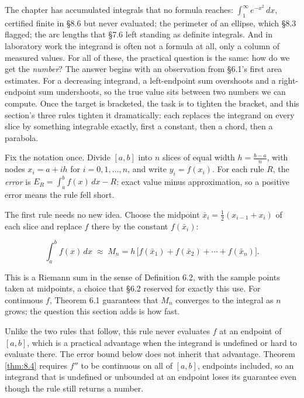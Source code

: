 \documentclass[a4paper,12pt,oneside]{memoir}
\begin{document}
The chapter has accumulated integrals that no formula reaches: \(\int_{1}^{\infty} e^{-x^{2}}\,dx\), certified finite in §8.6 but never evaluated; the perimeter of an ellipse, which §8.3 flagged; the arc lengths that §7.6 left standing as definite integrals. And in laboratory work the integrand is often not a formula at all, only a column of measured values. For all of these, the practical question is the same: how do we get the \emph{number}? The answer begins with an observation from §6.1’s first area estimates. For a decreasing integrand, a left-endpoint sum overshoots and a right-endpoint sum undershoots, so the true value sits between two numbers we can compute. Once the target is bracketed, the task is to tighten the bracket, and this section’s three rules tighten it dramatically: each replaces the integrand on every slice by something integrable exactly, first a constant, then a chord, then a parabola.

Fix the notation once. Divide \([a, b]\) into \(n\) slices of equal width \(h = \tfrac{b - a}{n}\), with nodes \(x_{i} = a + ih\) for \(i = 0, 1, \dots, n\), and write \(y_{i} = f(x_{i})\). For each rule \(R\), the \emph{error} is \(E_{R} = \int_{a}^{b} f(x)\,dx - R\): exact value minus approximation, so a positive error means the rule fell short.

The first rule needs no new idea. Choose the midpoint \(\bar{x}_{i} = \tfrac{1}{2}(x_{i-1} + x_{i})\) of each slice and replace \(f\) there by the constant \(f(\bar{x}_{i})\):

\[ \int_{a}^{b} f(x)\,dx \;\approx\; M_{n} = h\,\bigl[f(\bar{x}_{1}) + f(\bar{x}_{2}) + \cdots + f(\bar{x}_{n})\bigr]. \tag{M} \]

This is a Riemann sum in the sense of Definition 6.2, with the sample points taken at midpoints, a choice that §6.2 reserved for exactly this use. For continuous \(f\), Theorem 6.1 guarantees that \(M_{n}\) converges to the integral as \(n\) grows; the question this section adds is how fast.

Unlike the two rules that follow, this rule never evaluates \(f\) at an endpoint of \([a, b]\), which is a practical advantage when the integrand is undefined or hard to evaluate there. The error bound below does not inherit that advantage. Theorem \ref{thm:8.4} requires \(f''\) to be continuous on all of \([a, b]\), endpoints included, so an integrand that is undefined or unbounded at an endpoint loses its guarantee even though the rule still returns a number.
\end{document}
